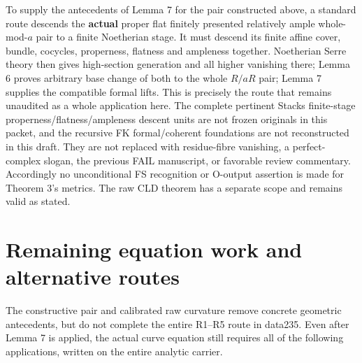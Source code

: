 \documentclass[
  11pt,
]{article}
\begin{document}
To supply the antecedents of Lemma 7 for the pair constructed above, a
standard route descends the \textbf{actual} proper flat finitely
presented relatively ample whole-mod-\(a\) pair to a finite Noetherian
stage. It must descend its finite affine cover, bundle, cocycles,
properness, flatness and ampleness together. Noetherian Serre theory
then gives high-section generation and all higher vanishing there; Lemma
6 proves arbitrary base change of both to the whole \(R/aR\) pair; Lemma
7 supplies the compatible formal lifts. This is precisely the route that
remains unaudited as a whole application here. The complete pertinent
Stacks finite-stage properness/flatness/ampleness descent units are not
frozen originals in this packet, and the recursive FK formal/coherent
foundations are not reconstructed in this draft. They are not replaced
with residue-fibre vanishing, a perfect-complex slogan, the previous
FAIL manuscript, or favorable review commentary. Accordingly no
unconditional FS recognition or O-output assertion is made for Theorem
3's metrics. The raw CLD theorem has a separate scope and remains valid
as stated.

\section{Remaining equation work and alternative
routes}\label{remaining-equation-work-and-alternative-routes}

The constructive pair and calibrated raw curvature remove concrete
geometric antecedents, but do not complete the entire R1--R5 route in
data235. Even after Lemma 7 is applied, the actual curve equation still
requires all of the following applications, written on the entire
analytic carrier.
\end{document}
